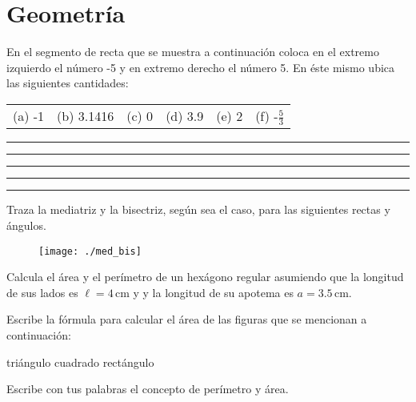 \documentclass[11pt]{article}
\begin{document}
\vspace{2.5cm}

\section{Geometr\'ia}

En el segmento de recta que se muestra a continuaci\'on coloca en el extremo izquierdo el n\'umero -5 y en extremo derecho el n\'umero 5. En \'este mismo  ubica las siguientes cantidades:


\begin{tabular}{p{2.5cm} p{2.5cm} p{2.5cm} p{2.5cm} p{2.5cm} p{2.5cm}}
(a) -1 &
(b) 3.1416 &
(c) 0 &
(d) 3.9 &
(e) 2 &
(f) -$\frac{5}{3} $
\end{tabular}

\vspace{2.4cm}

\begin{center}
    \rule[-1.5mm]{0.7pt}{3mm}\rule{5cm}{.7pt}\rule[-1.5mm]{0.7pt}{3mm}\rule{5cm}{.7pt}\rule[-1.5mm]{0.7pt}{3mm}
\end{center}

\vspace{1cm}

\newpage
Traza la mediatriz y la bisectriz, seg\'un sea el caso, para las siguientes rectas y \'angulos.

\begin{figure}[h!]
\centering
      \texttt{[image: ./med\_bis]}
\end{figure}

\vspace{-7cm}

Calcula el \'area y el per\'imetro de un hex\'agono regular asumiendo que la longitud de sus lados es $\ell = 4$\,cm y y la longitud de su apotema es $a = 3.5$\,cm.

\vspace{5cm}


Escribe la f\'ormula para calcular el \'area de las figuras que se mencionan a continuaci\'on:

\hspace{1cm} tri\'angulo \hfill cuadrado \hfill rect\'angulo \hspace{1cm}
\vspace{3cm}

Escribe con tus palabras el concepto de per\'imetro y \'area.
\vspace{3cm}


\end{document}
